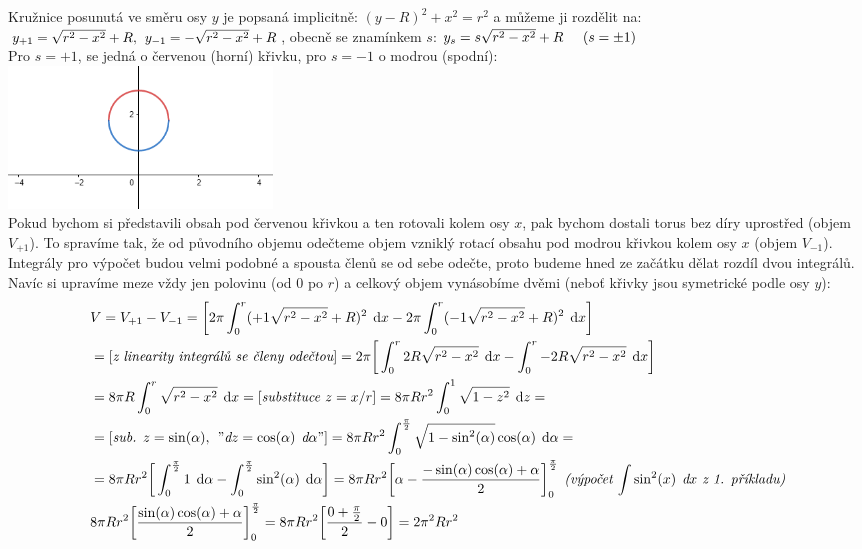 \documentclass[a4paper]{article}
\newcommand{\da}{\hspace{0.15cm}\text{d}\alpha}
\newcommand{\dx}{\hspace{0.15cm}\text{d}x}
\newcommand{\dz}{\hspace{0.15cm}\text{d}z}
\newcommand{\al}{\alpha}
\begin{document}
\section{}
Kružnice posunutá ve směru osy $y$ je popsaná implicitně: $(y-R)^2 + x^2 = r^2$ a můžeme ji rozdělit na: \\ $y_{+1}=\sqrt{r^2-x^2} +R, \hspace{0.15cm} y_{-1}=-\sqrt{r^2-x^2} +R$, obecně se znamínkem $s$: $y_s = s\sqrt{r^2-x^2} +R \hspace{0.5cm}(s = \pm1)$ \\
Pro $s = +1$, se jedná o červenou (horní) křivku, pro $s = -1$ o modrou (spodní): \\
\text{}\hspace{5.5cm}\includegraphics[width=7cm]{circle} \\
Pokud bychom si představili obsah pod červenou křivkou a ten rotovali kolem osy $x$, pak bychom dostali torus bez díry uprostřed (objem $V_{+1}$). To spravíme tak, že od původního objemu odečteme objem vzniklý rotací obsahu pod modrou křivkou kolem osy $x$ (objem $V_{-1}$). Integrály pro výpočet budou velmi podobné a spousta členů se od sebe odečte, proto budeme hned ze začátku dělat rozdíl dvou integrálů. Navíc si upravíme meze vždy jen polovinu (od $0$ po $r$) a celkový objem vynásobíme dvěmi (neboť křivky jsou symetrické podle osy $y$): \\
\begin{align*}
	& V = V_{+1} - V_{-1} = \bigg[ 2\pi \int_0^r (+1\sqrt{r^2-x^2} +R)^2 \dx - 2\pi \int_0^r (-1\sqrt{r^2-x^2} +R)^2 \dx\bigg] \\
	& = [\textit{z linearity integrálů se členy odečtou}] = 2\pi \bigg[ \int_0^r 2R\sqrt{r^2-x^2}  \dx - \int_0^r -2R\sqrt{r^2-x^2} \dx\bigg] \\
	& = 8\pi R \int_0^r \sqrt{r^2-x^2}  \dx = [\textit{substituce $z = x/r$}] = 8\pi Rr^2 \int_0^1 \sqrt{1-z^2} \dz = \\
	& = [\textit{sub. $z=\sin(\al),\hspace{0.15cm} "\hspace{-0.15cm}\dz = \cos(\al) \da"$}] =  8\pi Rr^2 \int_0^\frac{\pi}{2} \sqrt{1-\sin^2(\al)} \cos(\al) \da = \\
	& = 8\pi Rr^2 \bigg[ \int_0^\frac{\pi}{2} 1 \da - \int_0^\frac{\pi}{2} \sin^2(\al) \da \bigg] =  8\pi Rr^2 \bigg[\al - \frac{-\sin(\al)\cos(\al) + \al}{2} \bigg]_0^\frac{\pi}{2} \textit{\hspace{0.15cm}(výpočet $\int \sin^2(x) \dx$ z 1. příkladu)} \\
	& 8\pi Rr^2 \bigg[\frac{\sin(\al)\cos(\al) + \al}{2} \bigg]_0^\frac{\pi}{2} = 8\pi Rr^2 \bigg[\frac{0 + \frac{\pi}{2}}{2}-0 \bigg] = 2\pi^2 Rr^2
\end{align*}
\end{document}
